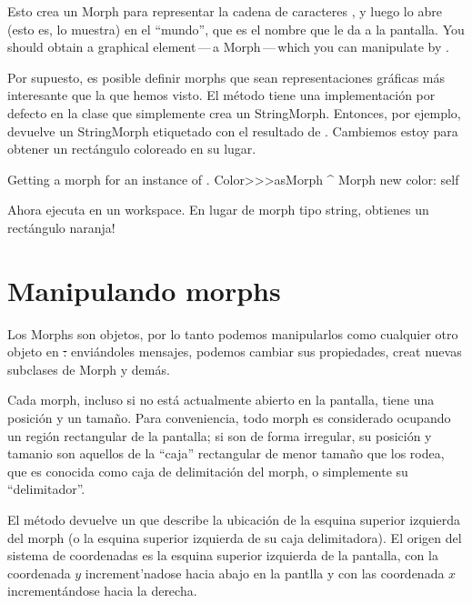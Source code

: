 \documentclass[a4paper,10pt,twoside]{book}
\begin{document}
Esto crea un Morph para representar la cadena de caracteres , y luego lo abre (esto es, lo muestra) en el ``mundo'', que es el nombre que \pharo le da a la pantalla.
You should obtain a graphical element\,---\,a Morph\,---\,which you can manipulate by .

Por supuesto, es posible definir morphs que sean representaciones gr\'aficas  m\'as interesante que la que hemos visto.
El m\'etodo  tiene una implementaci\'on por defecto en la clase   que simplemente crea un StringMorph.
Entonces, por ejemplo,  devuelve un StringMorph etiquetado con el resultado de  .
Cambiemos estoy para obtener un rect\'angulo coloreado en su lugar.


\begin{method}{Getting a morph for an instance of .}
Color>>>asMorph
	^ Morph new color: self
\end{method}
\noindent
Ahora ejecuta   en un workspace. En lugar de morph tipo string, obtienes un rect\'angulo naranja!



\section{Manipulando morphs}

Los Morphs son objetos, por lo tanto podemos manipularlos como cualquier otro objeto en \st: envi\'andoles mensajes, podemos cambiar sus propiedades, creat nuevas subclases de Morph y demás.

Cada morph, incluso si no est\'a actualmente abierto en la pantalla, tiene una posición y un tamaño.
Para conveniencia, todo morph es considerado ocupando un regi\'on rectangular de la pantalla; si son de forma irregular, su posici\'on y tamanio son aquellos de la ``caja'' rectangular de menor tamaño que los rodea, que es conocida como caja de delimitaci\'on del morph, o simplemente su ``delimitador''.


El método  devuelve un  que describe la ubicaci\'on de la esquina superior izquierda del morph  (o la esquina superior izquierda de su caja delimitadora).
El origen del sistema de coordenadas es la esquina superior izquierda de la pantalla, con la coordenada $y$  increment'nadose hacia abajo en la pantlla y con las coordenada $x$ increment\'andose hacia la derecha.
\end{document}
